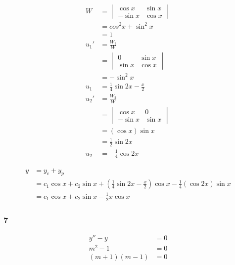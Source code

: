 \documentclass{article}
\begin{document}
\begin{align*}
  W    & = \begin{vmatrix}
             \cos x  & \sin x \\
             -\sin x & \cos x
           \end{vmatrix}                  \\
       & = cos^2 x + \sin^2 x                \\
       & = 1                                 \\
  u_1' & = \frac{W_1}{W}                     \\
       & = \begin{vmatrix}
             0      & \sin x \\
             \sin x & \cos x
           \end{vmatrix}                   \\
       & = -\sin^2 x                         \\
  u_1  & = \frac{1}{4} \sin 2x - \frac{x}{2} \\
  u_2' & = \frac{W_2}{W}                     \\
       & = \begin{vmatrix}
             \cos x  & 0      \\
             -\sin x & \sin x
           \end{vmatrix}                  \\
       & = (\cos x) \sin x                   \\
       & = \frac{1}{2} \sin 2x               \\
  u_2  & = -\frac{1}{4} \cos 2x
\end{align*}

\begin{align*}
  y & = y_c + y_p                                                                                                        \\
    & = c_1 \cos x + c_2 \sin x + \left( \frac{1}{4} \sin 2x - \frac{x}{2} \right) \cos x - \frac{1}{4} (\cos 2x) \sin x \\
    & = c_1 \cos x + c_2 \sin x - \frac{1}{2} x \cos x
\end{align*}

\subsubsection{7}

\begin{align*}
  y'' - y         & = 0 \\
  m^2 - 1         & = 0 \\
  (m + 1) (m - 1) & = 0
\end{align*}
\end{document}
